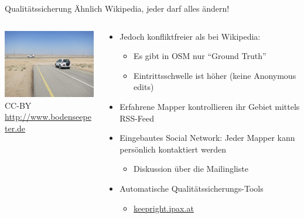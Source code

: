 \documentclass[handout]{beamer}
\begin{document}
\begin{frame}{Qualitätssicherung}
Ähnlich Wikipedia, jeder darf alles ändern!
  \begin{columns}[c]
    \begin{column}[T]{.35\textwidth}
      \vspace{1cm}
      \includegraphics[width=4.5cm]{unconnected.jpg} \\
      {\TINY CC-BY \url{http://www.bodenseepeter.de}}
    \end{column}
    \pause
    \begin{column}[T]{.7\textwidth}
      \begin{itemize}
        \item Jedoch konfliktfreier als bei Wikipedia:
        \begin{itemize}
          \item Es gibt in OSM nur "`Ground Truth"'
          \item Eintrittsschwelle ist höher (keine Anonymous edits)
        \end{itemize}
        \item Erfahrene Mapper kontrollieren ihr Gebiet mittels RSS-Feed
        \pause
        \item Eingebautes Social Network: Jeder Mapper kann persönlich kontaktiert werden
        \begin{itemize}
          \item Diskussion über die Mailingliste
        \end{itemize}
        \pause
        \item Automatische Qualitätssicherungs-Tools
        \begin{itemize}
          \item \href{http://keepright.ipax.at/report\_map.php?zoom=14&lat=48.20808&lon=16.37221}{keepright.ipax.at}
        \end{itemize}
      \end{itemize}

    \end{column}
  \end{columns}

\end{frame}
\end{document}
